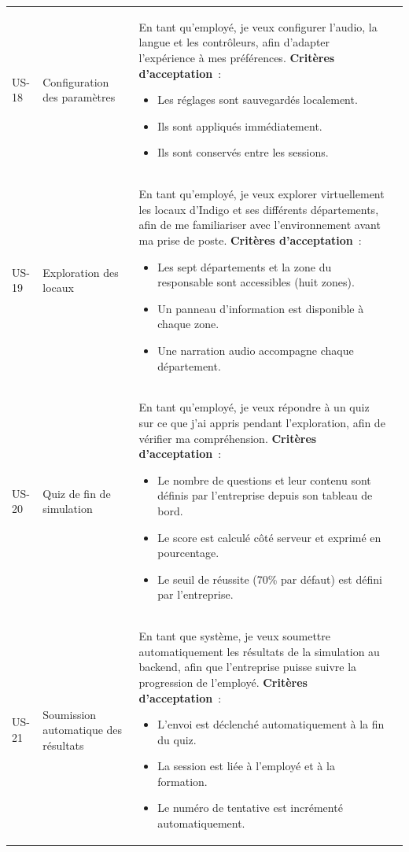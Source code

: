\begin{longtable}{lp{2.8cm}p{8cm}l}
  US-18 & Configuration des paramètres &
    En tant qu'employé, je veux configurer l'audio, la langue et les
    contrôleurs, afin d'adapter l'expérience à mes préférences.
    \newline\textbf{Critères d'acceptation}~:
    \begin{itemize}
      \item Les réglages sont sauvegardés localement.
      \item Ils sont appliqués immédiatement.
      \item Ils sont conservés entre les sessions.
    \end{itemize}
    & \should{} \\[4pt]

  US-19 & Exploration des locaux &
    En tant qu'employé, je veux explorer virtuellement les locaux
    d'Indigo et ses différents départements, afin de me familiariser
    avec l'environnement avant ma prise de poste.
    \newline\textbf{Critères d'acceptation}~:
    \begin{itemize}
      \item Les sept départements et la zone du responsable sont accessibles (huit zones).
      \item Un panneau d'information est disponible à chaque zone.
      \item Une narration audio accompagne chaque département.
    \end{itemize}
    & \must{} \\[4pt]

  US-20 & Quiz de fin de simulation &
    En tant qu'employé, je veux répondre à un quiz sur ce que j'ai
    appris pendant l'exploration, afin de vérifier ma compréhension.
    \newline\textbf{Critères d'acceptation}~:
    \begin{itemize}
      \item Le nombre de questions et leur contenu sont définis par l'entreprise depuis son tableau de bord.
      \item Le score est calculé côté serveur et exprimé en pourcentage.
      \item Le seuil de réussite (70\% par défaut) est défini par l'entreprise.
    \end{itemize}
    & \must{} \\[4pt]

  US-21 & Soumission automatique des résultats &
    En tant que système, je veux soumettre automatiquement les
    résultats de la simulation au backend, afin que l'entreprise
    puisse suivre la progression de l'employé.
    \newline\textbf{Critères d'acceptation}~:
    \begin{itemize}
      \item L'envoi est déclenché automatiquement à la fin du quiz.
      \item La session est liée à l'employé et à la formation.
      \item Le numéro de tentative est incrémenté automatiquement.
    \end{itemize}
    & \must{} \\[4pt]


\end{longtable}

